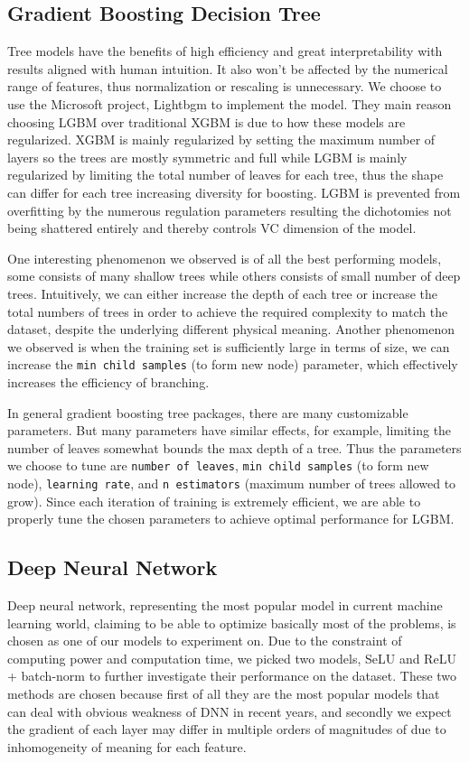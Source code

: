 \documentclass{article}
\begin{document}
\subsection{Gradient Boosting Decision Tree}
Tree models have the benefits of high efficiency and great interpretability with results aligned with human intuition. It also won't be affected by the numerical range of features, thus normalization or rescaling is unnecessary. We choose to use the Microsoft project, Lightbgm to implement the model. They main reason choosing LGBM over traditional XGBM is due to how these models are regularized. XGBM is mainly regularized by setting the maximum number of layers so the trees are mostly symmetric and full while LGBM is mainly regularized by limiting the total number of leaves for each tree, thus the shape can differ for each tree increasing diversity for boosting. LGBM is prevented from overfitting by the numerous regulation parameters resulting the dichotomies not being shattered entirely and thereby controls VC dimension of the model.


One interesting phenomenon we observed is of all the best performing models, some consists of many shallow trees while others consists of small number of deep trees. Intuitively, we can either increase the depth of each tree or increase the total numbers of trees in order to achieve the required complexity to match the dataset, despite the underlying different physical meaning. Another phenomenon we observed is when the training set is sufficiently large in terms of size, we can increase the \texttt{min child samples} (to form new node) parameter, which effectively increases the efficiency of branching.


In general gradient boosting tree packages, there are many customizable parameters. But many parameters have similar effects, for example, limiting the number of leaves somewhat bounds the max depth of a tree. Thus the parameters we choose to tune are \texttt{number of leaves}, \texttt{min child samples} (to form new node), \texttt{learning rate}, and \texttt{n estimators} (maximum number of trees allowed to grow). Since each iteration of training is extremely efficient, we are able to properly tune the chosen parameters to achieve optimal performance for LGBM.


\subsection{Deep Neural Network}
Deep neural network, representing the most popular model in current machine learning world, claiming to be able to optimize basically most of the problems, is chosen as one of our models to experiment on. Due to the constraint of computing power and computation time, we picked two models, SeLU and ReLU + batch-norm to further investigate their performance on the dataset. These two methods are chosen because first of all they are the most popular models that can deal with obvious weakness of DNN in recent years, and secondly we expect the gradient of each layer may differ in multiple orders of magnitudes of due to inhomogeneity of meaning for each feature.
\end{document}
